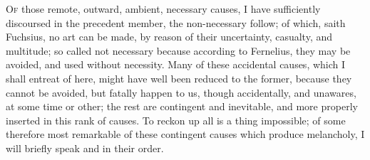 {\lettrine{O}{f} those remote, outward, ambient, necessary causes, I have
sufficiently discoursed in the precedent member, the non-necessary
follow; of which, saith Fuchsius, no art can be made, by reason
of their uncertainty, casualty, and multitude; so called not necessary
because according to Fernelius, they may be avoided, and used
without necessity. Many of these accidental causes, which I shall
entreat of here, might have well been reduced to the former, because
they cannot be avoided, but fatally happen to us, though accidentally,
and unawares, at some time or other; the rest are contingent and
inevitable, and more properly inserted in this rank of causes. To
reckon up all is a thing impossible; of some therefore most remarkable
of these contingent causes which produce melancholy, I will briefly
speak and in their order.

}

